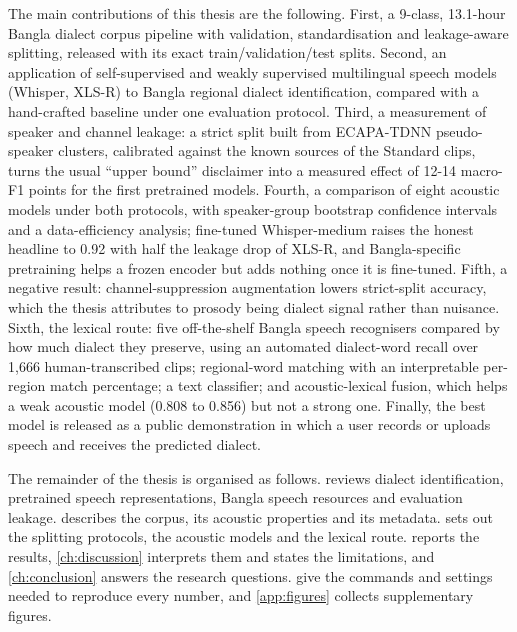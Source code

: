 The main contributions of this thesis are the following. First, a 9-class,
13.1-hour Bangla dialect corpus pipeline with validation, standardisation and
leakage-aware splitting, released with its exact train/validation/test splits.
Second, an application of self-supervised and weakly supervised multilingual
speech models (Whisper, XLS-R) to Bangla regional dialect identification,
compared with a hand-crafted baseline under one evaluation protocol. Third, a
measurement of speaker and channel leakage: a strict split built from
ECAPA-TDNN pseudo-speaker clusters, calibrated against the known sources of the
Standard clips, turns the usual ``upper bound'' disclaimer into a measured
effect of 12-14 macro-F1 points for the first pretrained models. Fourth, a
comparison of eight acoustic models under both protocols, with speaker-group
bootstrap confidence intervals and a data-efficiency analysis; fine-tuned
Whisper-medium raises the honest headline to 0.92 with half the leakage drop of
XLS-R, and Bangla-specific pretraining helps a frozen encoder but adds nothing
once it is fine-tuned. Fifth, a negative result: channel-suppression
augmentation lowers strict-split accuracy, which the thesis attributes to
prosody being dialect signal rather than nuisance. Sixth, the lexical route:
five off-the-shelf Bangla speech recognisers compared by how much dialect they
preserve, using an automated dialect-word recall over 1,666 human-transcribed
clips; regional-word matching with an interpretable per-region match
percentage; a text classifier; and acoustic-lexical fusion, which helps a weak
acoustic model (0.808 to 0.856) but not a strong one. Finally, the best model
is released as a public demonstration in which a user records or uploads speech
and receives the predicted dialect.

The remainder of the thesis is organised as follows. 
reviews dialect identification, pretrained speech representations, Bangla
speech resources and evaluation leakage.  describes the corpus,
its acoustic properties and its metadata.  sets out the
splitting protocols, the acoustic models and the lexical route.
 reports the results, \cref{ch:discussion} interprets them and
states the limitations, and \cref{ch:conclusion} answers the research
questions.  give the commands and settings needed
to reproduce every number, and \cref{app:figures} collects supplementary
figures.
